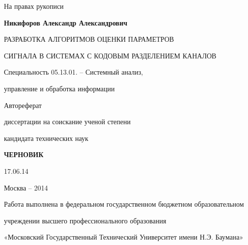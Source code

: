\hfill На правах рукописи

\vspace{\baselineskip}
\vspace{\baselineskip}
\vspace{\baselineskip}

\noindent\centerline{\bf{Никифоров Александр Александрович}}

\vspace{\baselineskip}
\vspace{\baselineskip}
\vspace{\baselineskip}

\noindent\centerline{РАЗРАБОТКА АЛГОРИТМОВ ОЦЕНКИ ПАРАМЕТРОВ}
\noindent\centerline{СИГНАЛА В СИСТЕМАХ С КОДОВЫМ РАЗДЕЛЕНИЕМ КАНАЛОВ}

\vspace{\baselineskip}
\vspace{\baselineskip}
\vspace{\baselineskip}

\noindent\centerline{Специальность 05.13.01. – Системный анализ,}
\noindent\centerline{управление и обработка информации}

\vspace{\baselineskip}
\vspace{\baselineskip}
\vspace{\baselineskip}

\noindent\centerline{Автореферат} 
\noindent\centerline{диссертации на соискание ученой степени}
\noindent\centerline{кандидата технических наук}


\vspace{\baselineskip}
\vspace{\baselineskip}
\vspace{\baselineskip}
\noindent\centerline{\bf{ЧЕРНОВИК}}
\noindent\centerline{17.06.14}

\vfill
\noindent\centerline{Москва – 2014}

\newpage

\noindent\centerline{Работа выполнена в федеральном государственном бюджетном образовательном}
\noindent\centerline{учреждении высшего профессионального образования}
\noindent\centerline{«Московский Государственный Технический Университет имени Н.Э. Баумана»}
\vspace{\baselineskip}

